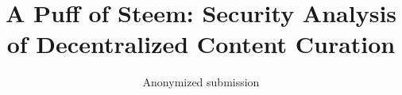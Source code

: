 \title{A Puff of Steem: Security Analysis of Decentralized Content Curation}
\author{Anonymized submission}
\institute{}
\maketitle
